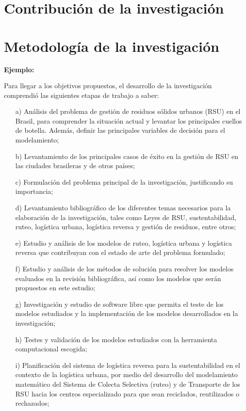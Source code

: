 \section{Contribución de la investigación}


\section{Metodología de la investigación}

{\bf Ejemplo:}\par
\vskip 0.1cm
Para llegar a los objetivos propuestos, el desarrollo de la investigación comprendió las siguientes etapas de trabajo a saber:
\begin{enumerate}
\item[a)] Análisis del problema de gestión de residuos sólidos urbanos (RSU) en el Brasil, para comprender la situación actual y levantar los principales cuellos de botella. Además, definir las principales variables de decisión para el modelamiento;
\item[b)]	Levantamiento de los principales casos de éxito en la gestión de RSU en las ciudades brasileras y de otros países;  
\item[c)]	Formulación del problema principal de la investigación, justificando su importancia;
\item[d)]	Levantamiento bibliográfico de los diferentes temas necesarios para la elaboración de la investigación, tales como Leyes de RSU, sustentabilidad, ruteo, logística urbana, logística reversa y gestión de residuos, entre otros;
\item[e)]	Estudio y análisis de los modelos de ruteo, logística urbana y logística reversa que contribuyan con el estado de arte del problema formulado;
\item[f)]	Estudio y análisis de los métodos de solución para resolver los modelos evaluados en la revisión bibliográfica, así como los modelos que serán propuestos en este estudio;
\item[g)]	Investigación y estudio de software libre que permita el teste de los modelos estudiados y la implementación de los modelos desarrollados en la investigación;
\item[h)]	Testes y validación de los modelos estudiados con la herramienta computacional escogida;
\item[i)]	Planificación del sistema de logística reversa para la sustentabilidad en el contexto de la logística urbana, por medio del desarrollo del modelamiento matemático del Sistema de Colecta Selectiva (ruteo) y de Transporte de los RSU hacia los centros especializado para que sean reciclados, reutilizados o rechazados;

\end{enumerate}
